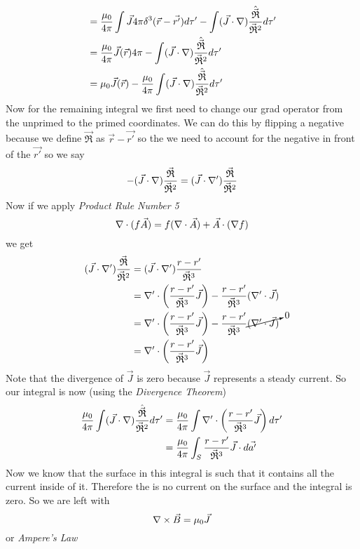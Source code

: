 \documentclass[11pt]{article}
\numberwithin{equation}{section}
\newcommand{\grad}{\bold\nabla}
\newcommand{\scrptR}{\vec{\mathfrak{R}}}
\begin{document}
\begin{enumerate}[(a)]
\begin{align*}
&= \frac{\mu_0}{4\pi}\int \vec{J}4\pi\delta^3(\vec{r}-\vec{r'})d\tau'-\int(\vec{J}\cdot\grad)\frac{\hat{\scrptR}}{\scrptR^2}d\tau'\\
&= \frac{\mu_0}{4\pi}\vec{J}(\vec{r})4\pi-\int(\vec{J}\cdot\grad)\frac{\hat{\scrptR}}{\scrptR^2}d\tau'\\
&= \mu_0\vec{J}(\vec{r})-\frac{\mu_0}{4\pi}\int(\vec{J}\cdot\grad)\frac{\hat{\scrptR}}{\scrptR^2}d\tau'
\end{align*}
Now for the remaining integral we first need to change our grad operator from the unprimed to the primed coordinates. We can do this by flipping a negative because we define $\scrptR$ as $\vec{r}-\vec{r'}$ so the we need to account for the negative in front of the $\vec{r'}$ so we say
$$-(\vec{J}\cdot\grad)\frac{\scrptR}{\scrptR^2} = (\vec{J}\cdot\grad')\frac{\scrptR}{\scrptR^2}$$
Now if we apply \emph{Product Rule Number 5}
$$\grad\cdot(f\vec{A}) = f(\grad\cdot\vec{A})+\vec{A}\cdot(\grad f)$$
we get
\begin{align*}
(\vec{J}\cdot\grad')\frac{\scrptR}{\scrptR^2} &= (\vec{J}\cdot\grad')\frac{r-r'}{\scrptR^3}\\
&= \grad'\cdot\left(\frac{r-r'}{\scrptR^3}\vec{J}\right) - \frac{r-r'}{\scrptR^3}(\grad'\cdot\vec{J})\\
&= \grad'\cdot\left(\frac{r-r'}{\scrptR^3}\vec{J}\right) - \frac{r-r'}{\scrptR^3}\cancelto{0}{(\grad'\cdot\vec{J})}\\
&= \grad'\cdot\left(\frac{r-r'}{\scrptR^3}\vec{J}\right)
\end{align*}
Note that the divergence of $\vec{J}$ is zero because $\vec{J}$ represents a steady current. So our integral is now (using the \emph{Divergence Theorem})
\begin{align*}
\frac{\mu_0}{4\pi}\int(\vec{J}\cdot\grad)\frac{\hat{\scrptR}}{\scrptR^2}d\tau' &= \frac{\mu_0}{4\pi}\int \grad'\cdot\left(\frac{r-r'}{\scrptR^3}\vec{J}\right) d\tau'\\
&= \frac{\mu_0}{4\pi}\int_S \frac{r-r'}{\scrptR^3}\vec{J}\cdot d\vec{a'}
\end{align*}
Now we know that the surface in this integral is such that it contains all the current inside of it. Therefore the is no current on the surface and the integral is zero. So we are left with
$$\grad\times\vec{B} = \mu_0\vec{J}$$
or \emph{Ampere's Law}


\end{enumerate}
\end{document}
